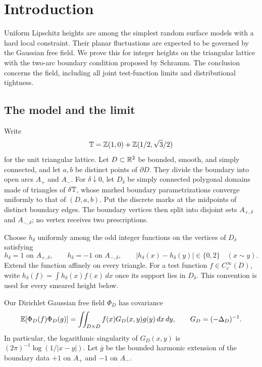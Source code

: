 \section{Introduction}\label{sec:introduction}

Uniform Lipschitz heights are among the simplest random surface models with a
hard local constraint.  Their planar fluctuations are expected to be governed
by the Gaussian free field.  We prove this for integer heights on the
triangular lattice with the two-arc boundary condition proposed by Schramm.
The conclusion concerns the field, including all joint test-function limits
and distributional tightness.

\subsection{The model and the limit}

Write
\[
 \mathbb T=\mathbb Z(1,0)+\mathbb Z(1/2,\sqrt3/2)
\]
for the unit triangular lattice.  Let $D\subset\mathbb R^2$ be bounded, smooth, and
simply connected, and let $a,b$ be distinct points of $\partial D$.  They
divide the boundary into open arcs $A_+$ and $A_-$.  For $\delta\downarrow0$,
let $D_\delta$ be simply connected polygonal domains made of triangles of
$\delta\mathbb T$, whose marked boundary parametrizations converge uniformly to
that of $(D,a,b)$.  Put the discrete marks at the midpoints of distinct
boundary edges.  The boundary vertices then split into disjoint sets
$A_{+,\delta}$ and $A_{-,\delta}$; no vertex receives two prescriptions.

Choose $h_\delta$ uniformly among the odd integer functions on the vertices
of $D_\delta$ satisfying
\begin{equation}\label{eq:odd-model}
 h_\delta=1\text{ on }A_{+,\delta},\qquad
 h_\delta=-1\text{ on }A_{-,\delta},\qquad
 |h_\delta(x)-h_\delta(y)|\in\{0,2\}\quad(x\sim y).
\end{equation}
Extend the function affinely on every triangle.  For a test function
$f\in C_c^\infty(D)$, write $h_\delta(f)=\int h_\delta(x)f(x)\,dx$ once its
support lies in $D_\delta$.  This convention is used for every smeared height
below.

Our Dirichlet Gaussian free field $\Phi_D$ has covariance
\begin{equation}\label{eq:gff-convention}
 \mathbb E[\Phi_D(f)\Phi_D(g)]
 =\iint_{D\times D}f(x)G_D(x,y)g(y)\,dx\,dy,
 \qquad G_D=(-\Delta_D)^{-1}.
\end{equation}
In particular, the logarithmic singularity of $G_D(x,y)$ is
$(2\pi)^{-1}\log(1/|x-y|)$.  Let $\bar g$ be the bounded harmonic extension
of the boundary data $+1$ on $A_+$ and $-1$ on $A_-$.

